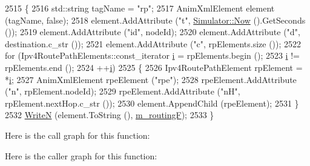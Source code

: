 \begin{DoxyCode}
2515 \{
2516   std::string tagName = \textcolor{stringliteral}{"rp"};
2517   AnimXmlElement element (tagName, \textcolor{keyword}{false});
2518   element.AddAttribute (\textcolor{stringliteral}{"t"}, \hyperlink{classns3_1_1Simulator_ac3178fa975b419f7875e7105be122800}{Simulator::Now} ().GetSeconds ());
2519   element.AddAttribute (\textcolor{stringliteral}{"id"}, nodeId);
2520   element.AddAttribute (\textcolor{stringliteral}{"d"}, destination.c\_str ());
2521   element.AddAttribute (\textcolor{stringliteral}{"c"}, rpElements.size ());
2522   \textcolor{keywordflow}{for} (Ipv4RoutePathElements::const\_iterator \hyperlink{bernuolliDistribution_8m_a6f6ccfcf58b31cb6412107d9d5281426}{i} = rpElements.begin ();
2523        \hyperlink{bernuolliDistribution_8m_a6f6ccfcf58b31cb6412107d9d5281426}{i} != rpElements.end ();
2524        ++\hyperlink{bernuolliDistribution_8m_a6f6ccfcf58b31cb6412107d9d5281426}{i})
2525     \{
2526       Ipv4RoutePathElement rpElement = *\hyperlink{bernuolliDistribution_8m_a6f6ccfcf58b31cb6412107d9d5281426}{i};
2527       AnimXmlElement rpeElement (\textcolor{stringliteral}{"rpe"});
2528       rpeElement.AddAttribute (\textcolor{stringliteral}{"n"}, rpElement.nodeId);
2529       rpeElement.AddAttribute (\textcolor{stringliteral}{"nH"}, rpElement.nextHop.c\_str ());
2530       element.AppendChild (rpeElement);
2531     \}
2532   \hyperlink{classns3_1_1AnimationInterface_a4cdd131c35733674773098d094f30066}{WriteN} (element.ToString (),  \hyperlink{classns3_1_1AnimationInterface_a51b17d826fa98c9854746dea46fa87f7}{m\_routingF});
2533 \}
\end{DoxyCode}


Here is the call graph for this function\+:




Here is the caller graph for this function\+:


